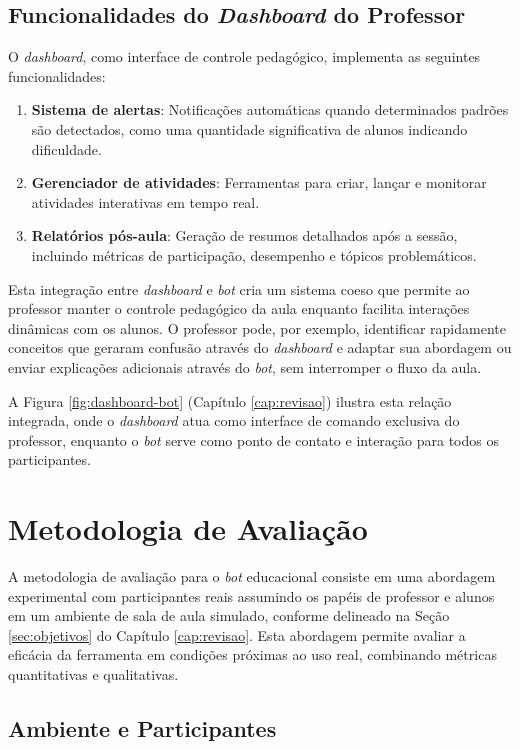 \subsection{Funcionalidades do \textit{Dashboard} do Professor}
O \textit{dashboard}, como interface de controle pedagógico, implementa as
seguintes funcionalidades:

\begin{enumerate}
\item \textbf{Sistema de alertas}: Notificações automáticas quando determinados
padrões são detectados, como uma quantidade significativa de alunos indicando
dificuldade.
\item \textbf{Gerenciador de atividades}: Ferramentas para criar, lançar e
monitorar atividades interativas em tempo real.
\item \textbf{Relatórios pós-aula}: Geração de resumos detalhados após a sessão,
incluindo métricas de participação, desempenho e tópicos problemáticos.
\end{enumerate}

Esta integração entre \textit{dashboard} e \textit{bot} cria um sistema coeso
que permite ao professor manter o controle pedagógico da aula enquanto facilita
interações dinâmicas com os alunos. O professor pode, por exemplo, identificar
rapidamente conceitos que geraram confusão através do \textit{dashboard} e
adaptar sua abordagem ou enviar explicações adicionais através do \textit{bot},
sem interromper o fluxo da aula.

A Figura \ref{fig:dashboard-bot} (Capítulo \ref{cap:revisao}) ilustra esta
relação integrada, onde o \textit{dashboard} atua como interface de comando
exclusiva do professor, enquanto o \textit{bot} serve como ponto de contato e
interação para todos os participantes.

\section{Metodologia de Avaliação}
\label{sec:metodologia}

A metodologia de avaliação para o \textit{bot} educacional consiste em uma
abordagem experimental com participantes reais assumindo os papéis de professor
e alunos em um ambiente de sala de aula simulado, conforme delineado na Seção
\ref{sec:objetivos} do Capítulo \ref{cap:revisao}. Esta abordagem permite
avaliar a eficácia da ferramenta em condições próximas ao uso real, combinando
métricas quantitativas e qualitativas.

\subsection{Ambiente e Participantes}
\label{subsec:ambiente}

